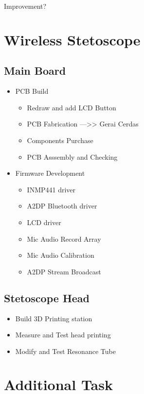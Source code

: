 \documentclass{article} %
\begin{document}
Improvement?

\section{Wireless Stetoscope}

\subsection{Main Board}

\begin{itemize}
    \item PCB Build
    \begin{itemize}
        \item Redraw and add LCD Button
        \item PCB Fabrication --->> Gerai Cerdas
        \item Components Purchase
        \item PCB Asssembly and Checking
    \end{itemize}

    \item Firmware Development
    \begin{itemize}
        \item INMP441 driver
        \item A2DP Bluetooth driver
        \item LCD driver
        \item Mic Audio Record Array
        \item Mic Audio Calibration
        \item A2DP Stream Broadcast
    \end{itemize}

\end{itemize}

\subsection{Stetoscope Head}

\begin{itemize}
    \item Build 3D Printing station
    \item Measure and Test head printing
    \item Modify and Test Resonance Tube
\end{itemize}

\newpage
\section{Additional Task}
\end{document}
